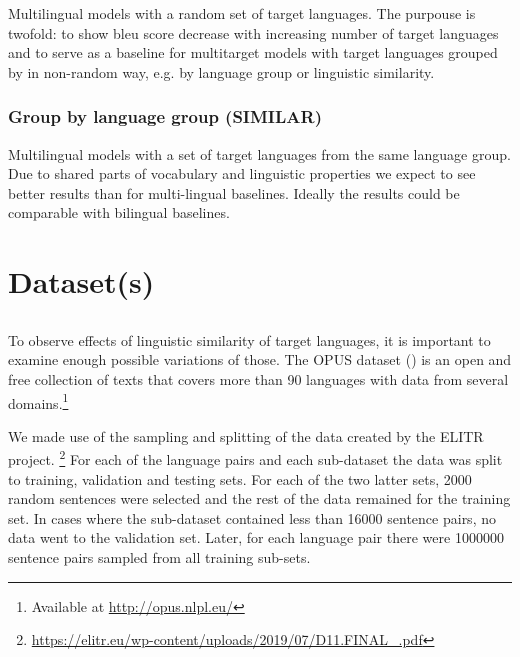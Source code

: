 Multilingual models with a random set of target languages.
The purpouse is twofold: 
to show \acrshort{bleu} score decrease with increasing number of target languages and
to serve as a baseline for multitarget models with target languages grouped by
in non-random way, e.g. by language group or linguistic similarity.


\subsubsection*{Group by language group (SIMILAR)}

Multilingual models with a set of target languages from the same language group.
Due to shared parts of vocabulary and linguistic properties we expect to
see better results than for multi-lingual baselines.
Ideally the results could be comparable with bilingual baselines.


% 


\section{Dataset(s)}
\label{section:datasets}


\subsection{}
\label{subsection:en-to-36}

To observe effects of linguistic similarity of target languages,
it is important to examine enough possible variations of those.
The OPUS dataset (\cite{TIEDEMANN12.463}) is an open and free collection of texts
that covers more than 90 languages with data from several
domains.\footnote{Available at \url{http://opus.nlpl.eu/}} 

We made use of the sampling and splitting of the data created by the ELITR project.%
\footnote{\url{https://elitr.eu/wp-content/uploads/2019/07/D11.FINAL\_.pdf}}
For each of the language pairs and each sub-dataset
the data was split to training, validation and testing sets.
For each of the two latter sets, 2000 random sentences were selected
and the rest of the data remained for the training set.
In cases where the sub-dataset contained less than 16000 sentence pairs,
no data went to the validation set.
Later, for each language pair there were 1000000 sentence pairs
sampled from all training sub-sets.

